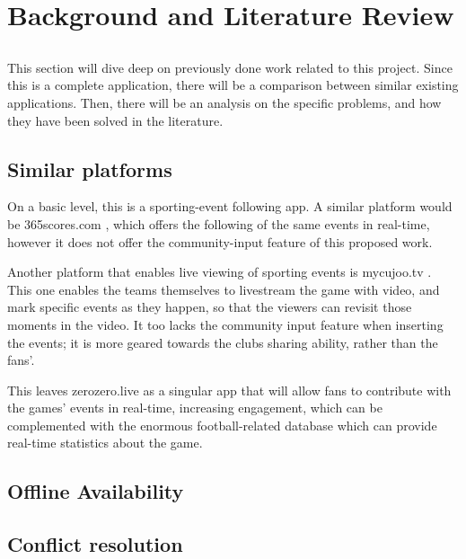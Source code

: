\chapter{Background and Literature Review} \label{chap:sota}

\section*{}

This section will dive deep on previously done work related to this project. Since this is a complete application, there will be a comparison between similar existing applications. Then, there will be an analysis on the specific problems, and how they have been solved in the literature.

\section{Similar platforms}
On a basic level, this is a sporting-event following app. A similar platform would be 365scores.com \cite{kn:365scores-about}, which offers the following of the same events in real-time, however it does not offer the community-input feature of this proposed work.

Another platform that enables live viewing of sporting events is mycujoo.tv \cite{kn:mycujoo-about}. This one enables the teams themselves to livestream the game with video, and mark specific events as they happen, so that the viewers can revisit those moments in the video. It too lacks the community input feature when inserting the events; it is more geared towards the clubs sharing ability, rather than the fans'. 

This leaves zerozero.live as a singular app that will allow fans to contribute with the games' events in real-time, increasing engagement, which can be complemented with the enormous football-related database which can provide real-time statistics about the game.




\section{Offline Availability}\label{sec:offline-avail-sota}

\section{Conflict resolution}\label{sec:conflict-res-sota}

